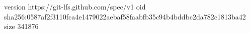 version https://git-lfs.github.com/spec/v1
oid sha256:0587af2f3110fca4e1479022aebaf58faabfb35c94b4bddbc2da782c1813ba42
size 341876
